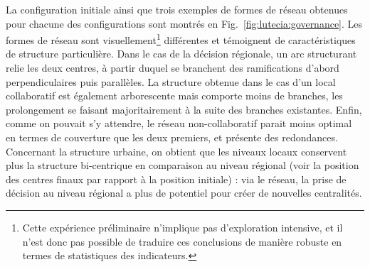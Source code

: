 La configuration initiale ainsi que trois exemples de formes de réseau obtenues pour chacune des configurations sont montrés en Fig.~\ref{fig:lutecia:governance}. Les formes de réseau sont visuellement\footnote{Cette expérience préliminaire n'implique pas d'exploration intensive, et il n'est donc pas possible de traduire ces conclusions de manière robuste en termes de statistiques des indicateurs.} différentes et témoignent de caractéristiques de structure particulière. Dans le cas de la décision régionale, un arc structurant relie les deux centres, à partir duquel se branchent des ramifications d'abord perpendiculaires puis parallèles. La structure obtenue dans le cas d'un local collaboratif est également arborescente mais comporte moins de branches, les prolongement se faisant majoritairement à la suite des branches existantes. Enfin, comme on pouvait s'y attendre, le réseau non-collaboratif parait moins optimal en termes de couverture que les deux premiers, et présente des redondances. Concernant la structure urbaine, on obtient que les niveaux locaux conservent plus la structure bi-centrique en comparaison au niveau régional (voir la position des centres finaux par rapport à la position initiale) : via le réseau, la prise de décision au niveau régional a plus de potentiel pour créer de nouvelles centralités.


